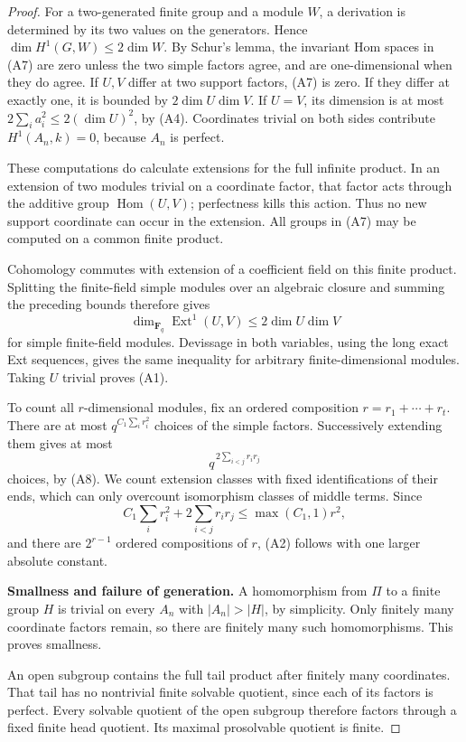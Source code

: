 \begin{proof}
For a two-generated finite group and a module \(W\), a derivation
is determined by its two values on the generators. Hence
\(\dim H^1(G,W)\leq2\dim W\).
By Schur's lemma, the invariant Hom spaces in (A7) are zero
unless the two simple factors agree, and are one-dimensional
when they do agree. If \(U,V\) differ at two support factors,
(A7) is zero. If they differ at exactly one, it is bounded by
\(2\dim U\dim V\). If \(U=V\), its dimension is at most
\(2\sum_i a_i^2\leq2(\dim U)^2\), by (A4).
Coordinates trivial on both sides contribute
\(H^1(A_n,k)=0\), because \(A_n\) is perfect.

These computations do calculate extensions for the full infinite
product. In an extension of two modules trivial on a coordinate
factor, that factor acts through the additive group
\(\operatorname{Hom}(U,V)\); perfectness kills this action.
Thus no new support coordinate can occur in the extension.
All groups in (A7) may be computed on a common finite product.

Cohomology commutes with extension of a coefficient field on this
finite product. Splitting the finite-field simple modules over
an algebraic closure and summing the preceding bounds therefore
gives
\[
 \dim_{\mathbf F_q}\operatorname{Ext}^1(U,V)
       \leq2\dim U\dim V
 \tag{A8}
\]
for simple finite-field modules. Devissage in both variables,
using the long exact Ext sequences, gives the same inequality
for arbitrary finite-dimensional modules. Taking \(U\) trivial
proves (A1).

To count all \(r\)-dimensional modules, fix an ordered composition
\(r=r_1+\cdots+r_t\). There are at most
\(q^{C_1\sum_i r_i^2}\) choices of the simple factors.
Successively extending them gives at most
\[
 q^{\,2\sum_{i<j}r_ir_j}
\]
choices, by (A8). We count extension classes with fixed
identifications of their ends, which can only overcount
isomorphism classes of middle terms. Since
\[
 C_1\sum_i r_i^2+2\sum_{i<j}r_ir_j
 \leq \max(C_1,1)r^2,
\]
and there are \(2^{r-1}\) ordered compositions of \(r\),
(A2) follows with one larger absolute constant.

\par\smallskip\noindent\textbf{Smallness and failure of generation.}\quad
A homomorphism from \(\Pi\) to a finite group \(H\) is trivial on
every \(A_n\) with \(|A_n|>|H|\), by simplicity. Only finitely many
coordinate factors remain, so there are finitely many such
homomorphisms. This proves smallness.

An open subgroup contains the full tail product after finitely
many coordinates. That tail has no nontrivial finite solvable
quotient, since each of its factors is perfect. Every solvable
quotient of the open subgroup therefore factors through a fixed
finite head quotient. Its maximal prosolvable quotient is finite.


\end{proof}
